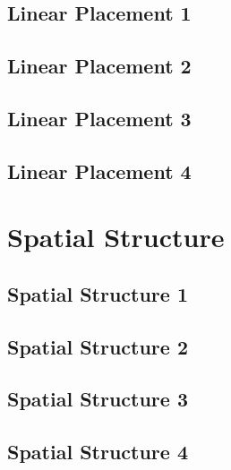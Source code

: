 \documentclass{scrartcl}
\begin{document}
\subsection{Linear Placement 1} 
\label{sec:linear_1}
\clearpage

\subsection{Linear Placement 2} 
\label{sec:linear_2}
\clearpage

\subsection{Linear Placement 3} 
\label{sec:linear_3}
\clearpage

\subsection{Linear Placement 4} 
\label{sec:linear_4}
\clearpage

\section{Spatial Structure}
\label{sec:spatial_structure}

\subsection{Spatial Structure 1}
\label{sec:spatial_1}
\clearpage

\subsection{Spatial Structure 2}
\label{sec:spatial_2}
\clearpage

\subsection{Spatial Structure 3}
\label{sec:spatial_3}
\clearpage

\subsection{Spatial Structure 4}
\label{sec:spatial_4}
\clearpage
\end{document}
